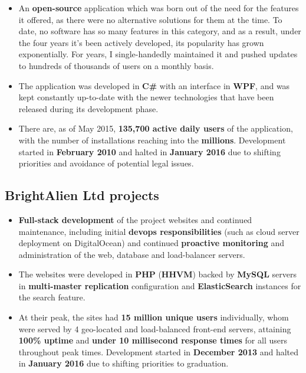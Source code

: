 \documentclass[11pt,a4paper,sans]{moderncv}
\begin{document}
	\begin{itemize}
		\item An \textbf{open-source} application which was born out of the need for the features it offered, as there were no alternative solutions for them at the time. To date, no software has so many features in this category, and as a result, under the four years it's been actively developed, its popularity has grown exponentially. For years, I single-handedly maintained it and pushed updates to hundreds of thousands of users on a monthly basis.

		\item The application was developed in \textbf{C\#} with an interface in \textbf{WPF}, and was kept constantly up-to-date with the newer technologies that have been released during its development phase.

		\item There are, as of May 2015, \textbf{135,700 active daily users} of the application, with the number of installations reaching into the \textbf{millions}. Development started in \textbf{February 2010} and halted in \textbf{January 2016} due to shifting priorities and avoidance of potential legal issues.
	\end{itemize}

	\subsection{BrightAlien Ltd projects}

	\begin{itemize}
		\item \textbf{Full-stack development} of the project websites and continued maintenance, including initial \textbf{devops responsibilities} (such as cloud server deployment on DigitalOcean) and continued \textbf{proactive monitoring} and administration of the web, database and load-balancer servers.

		\item The websites were developed in \textbf{PHP} (\textbf{HHVM}) backed by \textbf{MySQL} servers in \textbf{multi-master replication} configuration and \textbf{ElasticSearch} instances for the search feature.

		\item At their peak, the sites had \textbf{15 million unique users} individually, whom were served by 4 geo-located and load-balanced front-end servers, attaining \textbf{100\% uptime} and \textbf{under 10 millisecond response times} for all users throughout peak times. Development started in \textbf{December 2013} and halted in \textbf{January 2016} due to shifting priorities to graduation.
	\end{itemize}
\end{document}
